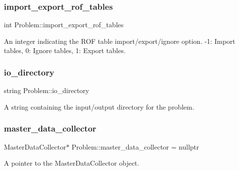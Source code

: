 \subsubsection{\texorpdfstring{import\+\_\+export\+\_\+rof\+\_\+tables}{import\_export\_rof\_tables}}
{\footnotesize\ttfamily int Problem\+::import\+\_\+export\+\_\+rof\+\_\+tables\hspace{0.3cm}{\ttfamily [protected]}}



An integer indicating the R\+OF table import/export/ignore option. -\/1\+: Import tables, 0\+: Ignore tables, 1\+: Export tables. 

\mbox{\label{classProblem_ac58848a0d808cf040c3fb3676b4a236f}} 
\subsubsection{\texorpdfstring{io\+\_\+directory}{io\_directory}}
{\footnotesize\ttfamily string Problem\+::io\+\_\+directory\hspace{0.3cm}{\ttfamily [protected]}}



A string containing the input/output directory for the problem. 

\mbox{\label{classProblem_a6cd1db1d587a449985d6514390ba8c96}} 
\subsubsection{\texorpdfstring{master\+\_\+data\+\_\+collector}{master\_data\_collector}}
{\footnotesize\ttfamily Master\+Data\+Collector$\ast$ Problem\+::master\+\_\+data\+\_\+collector = nullptr\hspace{0.3cm}{\ttfamily [protected]}}



A pointer to the Master\+Data\+Collector object. 

\mbox{\label{classProblem_a270a5672643bfe09e52e0f24e1884136}} 
